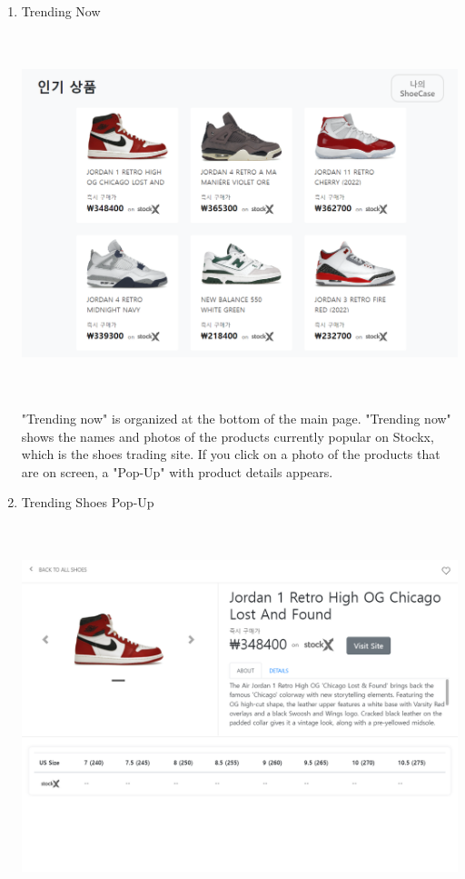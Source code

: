 \documentclass[conference]{IEEEtran}
\begin{document}
\begin{enumerate}
	\item Trending Now \\\\
\\\centerline{\includegraphics[scale=0.3]{pics/trending.png}}
\\\\ "Trending now" is organized at the bottom of the main page. "Trending now" shows the names and photos of the products currently popular on Stockx, which is the shoes trading site. If you click on a photo of the products that are on screen, a "Pop-Up" with product details appears.\\
	\item Trending Shoes Pop-Up\\\\
\\\centerline{\includegraphics[scale=0.35]{pics/trending_detail.png}}

\end{enumerate}
\end{document}
